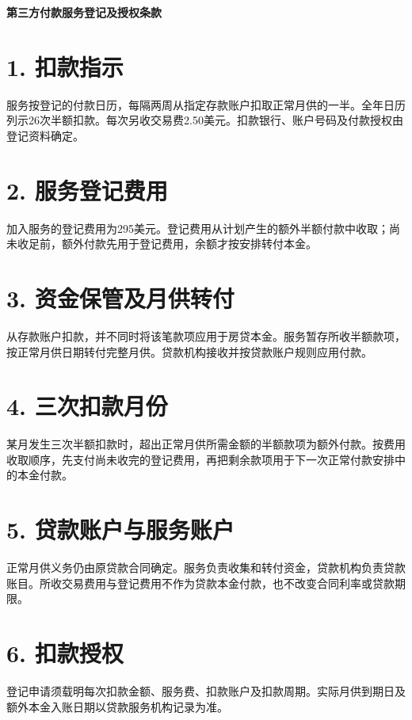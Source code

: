 \documentclass[UTF8,fontset=none,11pt,a4paper]{ctexart}
\begin{document}
{\noindent\fontsize{20}{25}\selectfont\bfseries 第三方付款服务登记及授权条款\par}
\vspace{10pt}
\section*{1. 扣款指示}
服务按登记的付款日历，每隔两周从指定存款账户扣取正常月供的一半。全年日历列示26次半额扣款。每次另收交易费2.50美元。扣款银行、账户号码及付款授权由登记\allowbreak\mbox{资料确定。}


\section*{2. 服务登记费用}
加入服务的登记费用为295美元。登记费用从计划产生的额外半额付款中收取；尚未收足前，额外付款先用于登记费用，余额才按安排\allowbreak\mbox{转付本金。}


\section*{3. 资金保管及月供转付}
从存款账户扣款，并不同时将该笔款项应用于房贷本金。服务暂存所收半额款项，按正常月供日期转付完整月供。贷款机构接收并按贷款账户规则\allowbreak\mbox{应用付款。}


\section*{4. 三次扣款月份}
某月发生三次半额扣款时，超出正常月供所需金额的半额款项为额外付款。按费用收取顺序，先支付尚未收完的登记费用，再把剩余款项用于下一次正常付款安排中的\allowbreak\mbox{本金付款。}


\section*{5. 贷款账户与服务账户}
正常月供义务仍由原贷款合同确定。服务负责收集和转付资金，贷款机构负责贷款账目。所收交易费用与登记费用不作为贷款本金付款，也不改变合同利率或\allowbreak\mbox{贷款期限。}


\section*{6. 扣款授权}
登记申请须载明每次扣款金额、服务费、扣款账户及扣款周期。实际月供到期日及额外本金入账日期以贷款服务机构\allowbreak\mbox{记录为准。}
\end{document}
